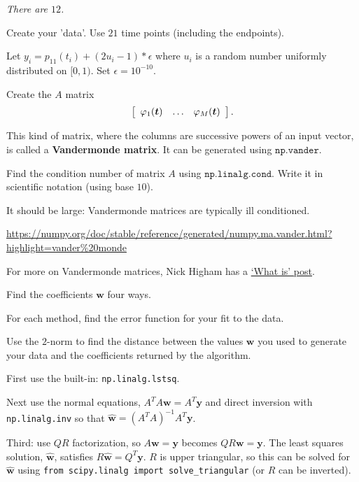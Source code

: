 \documentclass[12pt,letterpaper,noanswers]{exam}
\newcommand{\vc}[1]{\boldsymbol{#1}}
\begin{document}
\begin{questions}
\begin{parts}
\emph{There are $12$.}

\item Create your 'data'.  Use $21$ time points (including the endpoints).

Let $y_i = p_{11}(t_i) + (2u_i-1)*\epsilon$ where $u_i$ is a random number uniformly distributed on $[0,1)$.  Set $\epsilon = 10^{-10}$.

\item 
Create the $A$ matrix
\[
    \left[\begin{array}{c c c}
    \varphi_1(\vc{t}) & \hdots & \varphi_M(\vc{t})
    \end{array}\right].
\]

This kind of matrix, where the columns are successive powers of an input vector, is called a \textbf{Vandermonde matrix}.  It can be generated using $\texttt{np.vander}$.

Find the condition number of matrix $A$ using $\texttt{np.linalg.cond}$.  Write it in scientific notation (using base $10$).  

It should be large: Vandermonde matrices are typically ill conditioned.

\url{https://numpy.org/doc/stable/reference/generated/numpy.ma.vander.html?highlight=vander%20monde}

For more on Vandermonde matrices, Nick Higham has a \href{https://nhigham.com/2021/06/15/what-is-a-vandermonde-matrix/}{`What is' post}.
\item Find the coefficients $\vc{w}$ four ways.  

For each method, find the error function for your fit to the data.

Use the $2$-norm to find the distance between the values $\vc{w}$ you used to generate your data and the coefficients returned by the algorithm.

\begin{subparts}
\item First use the built-in: \texttt{np.linalg.lstsq}.

\item Next use the normal equations, $A^TA\vc{w} = A^T\vc{y}$ and direct inversion with \texttt{np.linalg.inv} so that $\hat{\vc{w}} = \left(A^TA\right)^{-1}A^T\vc{y}$.

\item Third: use $QR$ factorization, so $A\vc{w} = \vc{y}$ becomes $QR\vc{w}=\vc{y}$.  The least squares solution, $\hat{\vc{w}}$, satisfies $R\hat{\vc{w}} = Q^T\vc{y}$.  $R$ is upper triangular, so this can be solved for $\hat{\vc{w}}$ using \texttt{from scipy.linalg import solve\_triangular} (or $R$ can be inverted).


\end{subparts}
\end{parts}
\end{questions}
\end{document}
